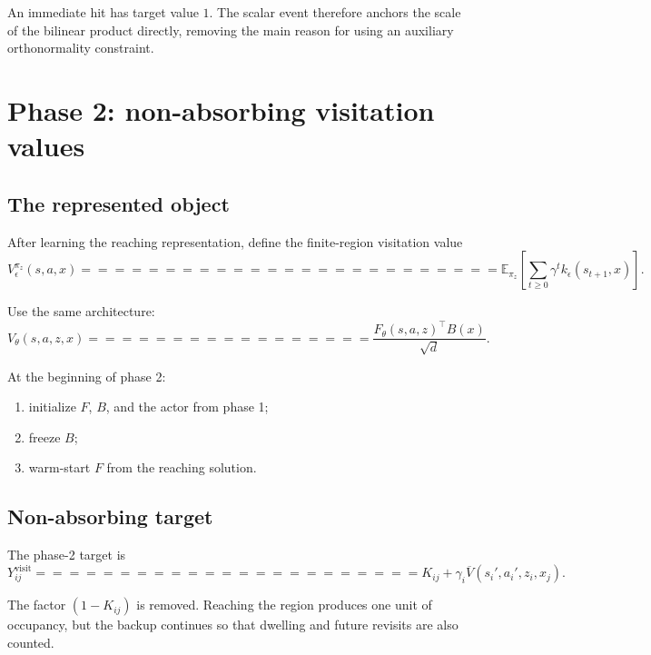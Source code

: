 \documentclass[10pt]{article}
\newcommand{\E}{\mathbb{E}}
\begin{document}
An immediate hit has target value $1$.
The scalar event therefore anchors the scale of the bilinear product directly, removing
the main reason for using an auxiliary orthonormality constraint.

\section{Phase 2: non-absorbing visitation values}

\subsection{The represented object}

After learning the reaching representation, define the finite-region visitation value
\begin{equation}
V_\epsilon^{\pi_z}(s,a,x)
=========================

\E_{\pi_z}
\left[
\sum_{t\geq0}
\gamma^t
k_\epsilon(s_{t+1},x)
\right].
\label{eq:visitation-value}
\end{equation}

Use the same architecture:
\begin{equation}
V_\theta(s,a,z,x)
=================

\frac{
F_\theta(s,a,z)^\top B(x)
}{
\sqrt{d}
}.
\label{eq:visitation-factorization}
\end{equation}

At the beginning of phase 2:
\begin{enumerate}
\item initialize $F$, $B$, and the actor from phase 1;
\item freeze $B$;
\item warm-start $F$ from the reaching solution.
\end{enumerate}

\subsection{Non-absorbing target}

The phase-2 target is
\begin{equation}
Y^{\mathrm{visit}}_{ij}
=======================

K_{ij}
+
\gamma_i
\overline{V}(s_i',a_i',z_i,x_j).
\label{eq:visitation-target}
\end{equation}

The factor $(1-K_{ij})$ is removed.
Reaching the region produces one unit of occupancy, but the backup continues so that
dwelling and future revisits are also counted.
\end{document}

